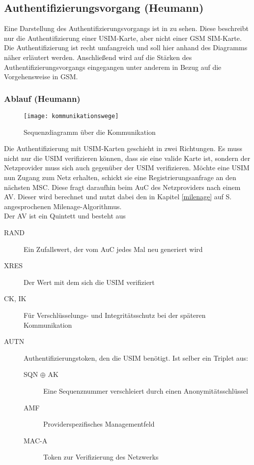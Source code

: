 \subsection{Authentifizierungsvorgang (Heumann)}
\label{authentifizierungsvorgang}

Eine Darstellung des Authentifizierungsvorgangs ist in  zu
sehen. Diese beschreibt nur die Authentifizierung einer \ac{USIM}-Karte, aber nicht einer
GSM \ac{SIM}-Karte. \\
Die Authentifizierung ist recht umfangreich und soll hier anhand des Diagramms näher
erläutert werden. Anschließend wird auf die Stärken des Authentifizierungs\-vorgangs
eingegangen unter anderem in Bezug auf die Vorgehensweise in GSM.

 \subsubsection{Ablauf (Heumann)}
 
 \begin{figure}[htp]
 \begin{center}
  \texttt{[image: kommunikationswege]}
 \end{center}
 \caption[Sequenzdiagramm über die Kommunikation zwischen SIM-Karte und Authentication Center]{Sequenzdiagramm über die Kommunikation}
 \label{fig:kommunikationswege}
\end{figure}

 Die Authentifizierung mit \ac{USIM}-Karten geschieht in zwei Richtungen. Es muss nicht nur die
 USIM verifizieren können, dass sie eine valide Karte ist, sondern der Netzprovider muss sich auch
 gegenüber der USIM verifizieren. Möchte eine USIM nun Zugang zum Netz erhalten, schickt sie
 eine Registrierungsanfrage an den nächsten \ac{MSC}. Diese fragt daraufhin beim \ac{AuC} des
 Netzproviders nach einem \ac{AV}. Dieser wird berechnet und nutzt dabei den in Kapitel
 \ref{milenage} auf S. \pageref{milenage} angesprochenen Milenage-Algorithmus. \\
 Der AV ist ein Quintett und besteht aus
 
 \begin{description}
  \item [RAND] Ein Zufallswert, der vom AuC jedes Mal neu generiert wird
  \item [XRES] Der Wert mit dem sich die USIM verifiziert
  \item [CK, IK] Für Verschlüsselungs- und Integritätsschutz bei der späteren Kommunikation
  \item [AUTN] Authentifizierungstoken, den die USIM benötigt. Ist selber ein Triplet aus:
  \begin{description}
   \item [SQN $\oplus$ AK] Eine Sequenznummer verschleiert durch einen Anonymitätsschlüssel
   \item [AMF] Providerspezifisches Managementfeld
   \item [MAC-A] Token zur Verifizierung des Netzwerks
  \end{description}
 \end{description}
 
